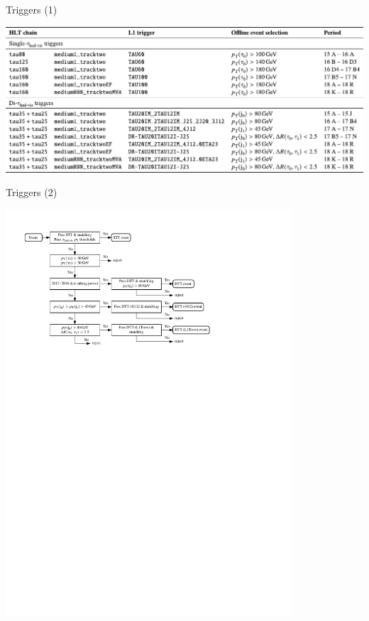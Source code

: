 \documentclass[11pt, xcolor={dvipsnames}, aspectratio=169]{beamer}
\begin{document}

\begin{frame}{Triggers (1)}
  \centering

  \includegraphics[width=\textwidth]{backup/triggers}
\end{frame}


\begin{frame}{Triggers (2)}
  \centering

  \includegraphics[width=0.8\textwidth]{selection/trigger_flowchart}
\end{frame}
\end{document}
